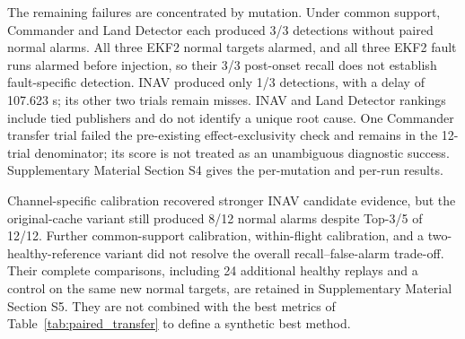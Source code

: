 The remaining failures are concentrated by mutation. Under common support, Commander and Land Detector each produced 3/3 detections without paired normal alarms. All three EKF2 normal targets alarmed, and all three EKF2 fault runs alarmed before injection, so their 3/3 post-onset recall does not establish fault-specific detection. INAV produced only 1/3 detections, with a delay of 107.623 s; its other two trials remain misses. INAV and Land Detector rankings include tied publishers and do not identify a unique root cause. One Commander transfer trial failed the pre-existing effect-exclusivity check and remains in the 12-trial denominator; its score is not treated as an unambiguous diagnostic success. Supplementary Material Section S4 gives the per-mutation and per-run results.

Channel-specific calibration recovered stronger INAV candidate evidence, but the original-cache variant still produced 8/12 normal alarms despite Top-3/5 of 12/12. Further common-support calibration, within-flight calibration, and a two-healthy-reference variant did not resolve the overall recall--false-alarm trade-off. Their complete comparisons, including 24 additional healthy replays and a control on the same new normal targets, are retained in Supplementary Material Section S5. They are not combined with the best metrics of Table~\ref{tab:paired_transfer} to define a synthetic best method.
